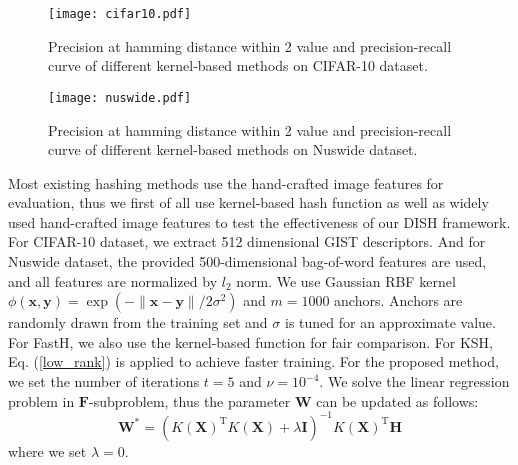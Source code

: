 \documentclass[conference]{IEEEtran}
\begin{document}
\begin{figure}[t]
    \centering
    \texttt{[image: cifar10.pdf]}
    \caption{Precision at hamming distance within 2 value and precision-recall curve of different kernel-based methods on CIFAR-10 dataset.}
    \label{fig:cifar10}
\end{figure}

\begin{figure}[t]
    \centering
    \texttt{[image: nuswide.pdf]}
    \caption{Precision at hamming distance within 2 value and precision-recall curve of different kernel-based methods on Nuswide dataset.}
    \label{fig:nuswide}
\end{figure}

Most existing hashing methods use the hand-crafted image features for evaluation, thus we first of all use kernel-based hash function as well as widely used hand-crafted image features to test the effectiveness of our DISH framework. For CIFAR-10 dataset, we extract 512 dimensional GIST descriptors. And for Nuswide dataset, the provided 500-dimensional bag-of-word features are used, and all features are normalized by $l_2$ norm. We use Gaussian RBF kernel $\phi(\mathbf{x}, \mathbf{y}) = \exp (-\| \mathbf{x} - \mathbf{y} \|/2\sigma^2)$ and $m=1000$ anchors. Anchors are randomly drawn from the training set and $\sigma$ is tuned for an approximate value. For FastH, we also use the kernel-based function for fair comparison. For KSH, Eq. (\ref{low_rank}) is applied to achieve faster training. For the proposed method, we set the number of iterations $t=5$ and $\nu=10^{-4}$. We solve the linear regression problem in $\mathbf{F}$-subproblem, thus the parameter $\mathbf{W}$ can be updated as follows:
\begin{equation}
\mathbf{W}^* = (K(\mathbf{X})^\mathrm{T} K(\mathbf{X}) + \lambda \mathbf{I})^{-1} K(\mathbf{X})^\mathrm{T} \mathbf{H}
\end{equation}
where we set $\lambda=0$.
\end{document}
